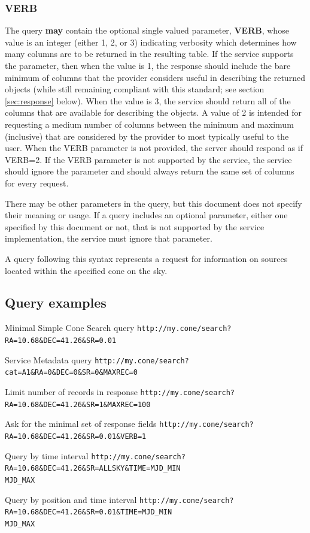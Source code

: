 \documentclass[11pt,a4paper]{ivoa} 
\begin{document}
\subsubsection{VERB} The query \textbf{may} contain the optional single
valued parameter, \textbf{VERB}, whose value is an integer (either 1, 2,
or 3) indicating verbosity which determines how many columns are to be
returned in the resulting table. If the service supports the parameter,
then when the value is 1, the response should include the bare minimum
of columns that the provider considers useful in describing the returned
objects (while still remaining compliant with this standard; see section
\ref{sec:response} below). When the value is 3, the service should
return all of the columns that are available for describing the objects.
A value of 2 is intended for requesting a medium number of columns
between the minimum and maximum (inclusive) that are considered by the
provider to most typically useful to the user. When the VERB parameter
is not provided, the server should respond as if VERB=2. If the VERB
parameter is not supported by the service, the service should ignore the
parameter and should always return the same set of columns for every
request.

There may be other parameters in the query, but this document does not
specify their meaning or usage. If a query includes an optional
parameter, either one specified by this document or not, that is not
supported by the service implementation, the service must ignore that
parameter.

A query following this syntax represents a request for information on
sources located within the specified cone on the sky.

\subsection{Query examples} \begin{bigdescription} \item[Minimal Simple
Cone Search query]
\nolinkurl{http://my.cone/search?RA=10.68\&DEC=41.26\&SR=0.01}
\item[Service Metadata query]
\nolinkurl{http://my.cone/search?cat=A1\&RA=0\&DEC=0\&SR=0\&MAXREC=0}
\item[Limit number of records in response]
\nolinkurl{http://my.cone/search?RA=10.68\&DEC=41.26\&SR=1\&MAXREC=100}
\item[Ask for the minimal set of response fields]
\nolinkurl{http://my.cone/search?RA=10.68\&DEC=41.26\&SR=0.01\&VERB=1}
\item[Query by time
interval]\nolinkurl{http://my.cone/search?RA=10.68\&DEC=41.26\&SR=ALLSKY&TIME=MJD\_MIN
MJD\_MAX} \item[Query by position and time
interval]\nolinkurl{http://my.cone/search?RA=10.68\&DEC=41.26\&SR=0.01&TIME=MJD\_MIN
MJD\_MAX} \end{bigdescription}
\end{document}

